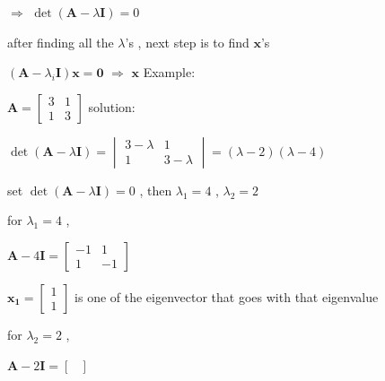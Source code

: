 \documentclass[12pt, a4paper]{article}
\begin{document}
{\par $\Longrightarrow$ $\det{\left( {\mathbf{A}} - \lambda{\mathbf{I}} \right) = 0}$ \qquad {\textcolor{anhao-sky}{特征（值）方程}}
\par after finding all the $\lambda$'s , next step is to find ${\mathbf{x}}$'s
\par $\left( {\mathbf{A}} - \lambda_i{\mathbf{I}} \right){\mathbf{x}} = {\mathbf{0}}$ $\Longrightarrow$ ${\mathbf{x}}$
\vspace{14pt}
\newline
Example:
\par 
\begin{math}
	{\mathbf{A}} = 
	\begin{bmatrix}
		3 & 1 \\
		1 & 3 
	\end{bmatrix}
\end{math}
\newline
solution:
\par
\begin{math}
	\det{\left( {\mathbf{A}} - \lambda{\mathbf{I}} \right)} = 
	\begin{vmatrix}
		3-\lambda & 1 \\
		1 & 3-\lambda 
	\end{vmatrix}
	 = 
	(\lambda-2)(\lambda-4)
\end{math}
\par set $\det{\left( {\mathbf{A}} - \lambda{\mathbf{I}} \right)} = 0$ , then $\lambda_1 = 4$ , $\lambda_2 = 2$
\par for $\lambda_1 = 4$ ,
\par\qquad 
\begin{math}
	{\mathbf{A}} - 4{\mathbf{I}} = 
	\begin{bmatrix}
		-1 & 1 \\
		1 & -1 
	\end{bmatrix}
\end{math}
\par\qquad 
\begin{math}
	{\mathbf{x_1}} = 
	\begin{bmatrix}
		1 \\
		1
	\end{bmatrix}
\end{math}
is one of the eigenvector that goes with that eigenvalue
\par for $\lambda_2 = 2$ ,
\par\qquad 
\begin{math}
	{\mathbf{A}} - 2{\mathbf{I}} = 
	\begin{bmatrix}

\end{bmatrix}
\end{math}}
\end{document}

